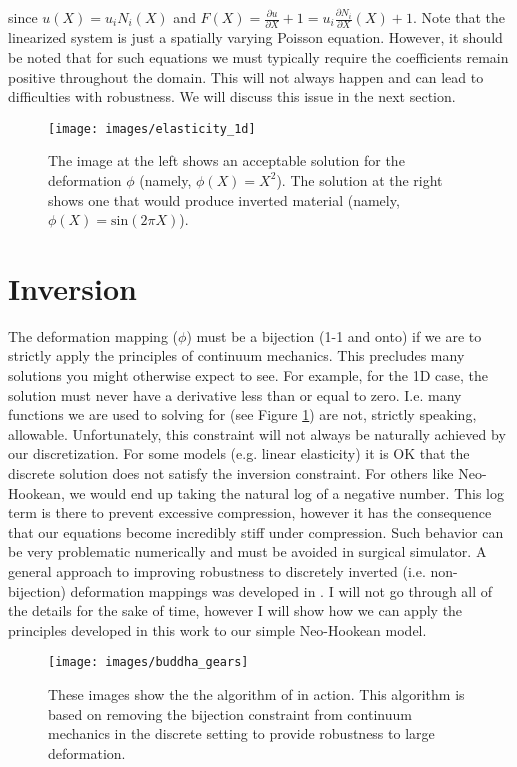 \documentclass[article]{pcms-l}
\begin{document}
since $u(X)=u_iN_i(X)$ and $F(X)=\frac{\partial{u}}{\partial{X}}+1=u_i\frac{\partial{N_i}}{\partial{X}}(X)+1$. Note that the linearized system is just a spatially varying Poisson equation. However, it should be noted that for such equations we must typically require the coefficients remain positive throughout the domain. This will not always happen and can lead to difficulties with robustness. We will discuss this issue in the next section.
\begin{figure}
\texttt{[image: images/elasticity\_1d]}
\caption{The image at the left shows an acceptable solution for the deformation $\phi$ (namely, $\phi(X)=X^2$). The solution at the right shows one that would produce inverted material (namely, $\phi(X)=\textrm{sin}(2\pi{X})$).}
\label{inversion}
\end{figure}
\section*{Inversion}
The deformation mapping ($\phi$) must be a bijection (1-1 and onto) if we are to strictly apply the principles of continuum mechanics. This precludes many solutions you might otherwise expect to see. For example, for the 1D case, the solution must never have a derivative less than or equal to zero. I.e. many functions we are used to solving for (see Figure \ref{inversion}) are not, strictly speaking, allowable. Unfortunately, this constraint will not always be naturally achieved by our discretization. For some models (e.g. linear elasticity) it is OK that the discrete solution does not satisfy the inversion constraint. For others like Neo-Hookean, we would end up taking the natural log of a negative number. This log term is there to prevent excessive compression, however it has the consequence that our equations become incredibly stiff under compression. Such behavior can be very problematic numerically and must be avoided in surgical simulator. A general approach to improving robustness to discretely inverted (i.e. non-bijection) deformation mappings was developed in \cite{Irving06}. I will not go through all of the details for the sake of time, however I will show how we can apply the principles developed in this work to our simple Neo-Hookean model.\\
\begin{figure}
\texttt{[image: images/buddha\_gears]}
\caption{These images show the the algorithm of \cite{Irving06} in action. This algorithm is based on removing the bijection constraint from continuum mechanics in the discrete setting to provide robustness to large deformation.}
\label{inversion2}
\end{figure}
\end{document}
